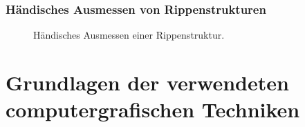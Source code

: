 







\subsubsection{H\"andisches Ausmessen von Rippenstrukturen}
\label{ribMeasure}

\begin{figure}[ht]
    \centering 
\caption{H\"andisches Ausmessen einer Rippenstruktur.} 
\label{im:domes}
\end{figure} 


\section{Grundlagen der verwendeten computergrafischen Techniken}

